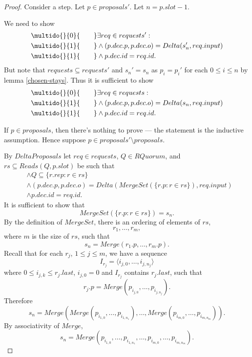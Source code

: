 \documentclass[12pt,a4paper,en]{pracamgr}
\newcommand{\ind}[1]{\multido{}{#1}{\qquad}}
\begin{document}
\begin{proof}
    Consider a step. Let $p \in proposals'$. Let $n = p.slot - 1$.

    We need to show
    \begin{align*}
        & \ind{0} \exists req \in requests':\\
        & \ind{1} \land (p.dec.p, p.dec.o) = Delta(s_n', req.input)\\
        & \ind{1} \land p.dec.id = req.id.
    \end{align*}
    But note that $requests \subseteq requests'$ and $s_n' = s_n$ as $p_i = p_i'$ for each $0 \le i \le n$ by lemma \ref{chosen-stays}. Thus it is sufficient to show
    \begin{align*}
        & \ind{0} \exists req \in requests:\\
        & \ind{1} \land (p.dec.p, p.dec.o) = Delta(s_n, req.input)\\
        & \ind{1} \land p.dec.id = req.id.
    \end{align*}

    If $p \in proposals$, then there's nothing to prove --- the statement is the inductive assumption. Hence suppose $p \in proposals' \setminus proposals$.

    By $DeltaProposals$ let $req \in requests$, $Q \in RQuorum$, and $rs \subseteq Reads(Q, p.slot)$ be such that
    \begin{align*}
        & \land Q \subseteq \{r.rep: r \in rs\}\\
        & \land (p.dec.p, p.dec.o) = Delta(MergeSet(\{r.p: r \in rs\}), req.input)\\
        & \land p.dec.id = req.id.
    \end{align*}
    It is sufficient to show that
    $$ MergeSet(\{r.p: r \in rs\}) = s_n. $$
    By the definition of $MergeSet$, there is an ordering of elements of $rs$,
    $$ r_1, \dots, r_m, $$
    where $m$ is the size of $rs$, such that
    $$ s_n = Merge(r_1.p, \dots, r_m.p). $$
    Recall that for each $r_j$, $1 \le j \le m$, we have a sequence
    $$ I_{r_j} = \langle i_{j, 0}, \dots, i_{j, n_j}\rangle $$
    where $0 \le i_{j, k} \le r_j.last$, $i_{j, 0} = 0$ and $I_{r_j}$ contains $r_j.last$, such that
    $$ r_j.p = Merge(p_{i_{j, 0}}, \dots, p_{i_{j, n_j}}). $$
    Therefore
    $$ s_n = Merge(Merge(p_{i_{1, 0}}, \dots, p_{i_{1, n_1}}), \dots, Merge(p_{i_{m, 0}}, \dots, p_{i_{m, n_m}})). $$
    By associativity of $Merge$,
    $$ s_n = Merge(p_{i_{1, 0}}, \dots, p_{i_{1, n_1}}, \dots, p_{i_{m, 0}}, \dots, p_{i_{m, n_m}}). $$


\end{proof}
\end{document}
